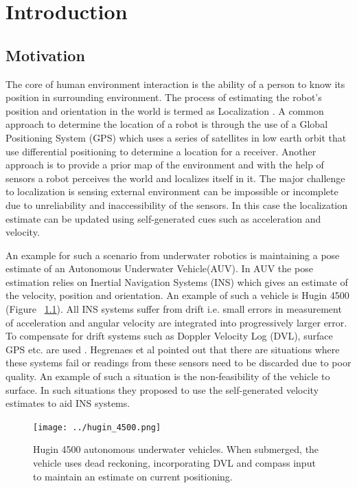 \documentclass[12pt]{dalcsthesis}
\begin{document}
\mainmatter

\chapter{Introduction}
 





\section{Motivation}
The core of human environment interaction is the ability of a person to know its position in surrounding environment. The process of estimating the robot's position and orientation in the world is termed as Localization \cite{thrun2005probabilistic}.  A common approach to determine the location of a robot is through the use of a Global Positioning System (GPS) which uses a series of satellites in low earth orbit that use differential positioning to determine a location for a receiver.  Another approach is to provide a prior map of the environment and with the help of sensors a robot perceives the world and localizes itself in it. The major challenge to localization is sensing  external environment can be impossible or incomplete due to unreliability and inaccessibility of the sensors. In this case the localization estimate can be updated using self-generated cues such as acceleration and velocity.

An example for such a scenario from underwater robotics is maintaining a pose estimate of an Autonomous Underwater Vehicle(AUV). In AUV the pose estimation relies on Inertial Navigation Systems (INS) which gives an estimate of the velocity, position and orientation. An example of such a vehicle is Hugin 4500 (Figure ~\ref{fig-Hugin 4500}). All INS systems suffer from drift i.e. small errors in measurement of acceleration and angular velocity are integrated into progressively larger error.  To compensate for drift systems such as Doppler Velocity Log (DVL), surface GPS etc. are used \cite{Lammas2004} \cite{leonard1998autonomous}. Hegrenaes et al \cite{Hegrenæs2008} pointed out that there are situations where these systems fail or readings from these sensors need to be discarded due to poor quality.  An example of such a situation is the non-feasibility of the vehicle to surface.  In such situations they proposed to use the self-generated velocity estimates to aid INS systems. 
\begin{figure}
  \centering
     {\texttt{[image: ../hugin\_4500.png]}}
  \caption{\label{fig-Hugin 4500} Hugin 4500 autonomous underwater vehicles. When submerged, the vehicle uses dead reckoning, incorporating DVL and compass input to maintain an estimate on current positioning.
}
\end{figure}
\end{document}
